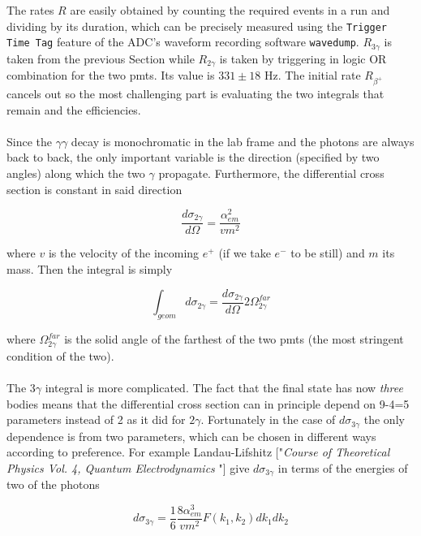 \documentclass[10pt,a4paper,twocolumn]{article}
\begin{document}
\\
\\
The rates $R$ are easily obtained by counting the required events in a run and dividing by its duration, which can be precisely measured using the \texttt{Trigger Time Tag} feature of the ADC's waveform recording software \texttt{wavedump}. $R_{3\gamma}$ is taken from the previous Section while $R_{2\gamma}$ is taken by triggering in logic OR combination for the two pmts. Its value is $331 \pm 18$ Hz. The initial rate $R_{\beta^+}$ cancels out so the most challenging part is evaluating the two integrals that remain and the efficiencies.
\\
\\
Since the $\gamma \gamma$ decay is monochromatic in the lab frame and the photons are always back to back, the only important variable is the direction (specified by two angles) along which the two $\gamma$ propagate. Furthermore, the differential cross section is constant in said direction

\begin{equation}
    \frac{d\sigma_{2\gamma}}{d\Omega}=\frac{\alpha_{em}^2}{vm^2}
\end{equation}

\noindent where $v$ is the velocity of the incoming $e^+$ (if we take $e^-$ to be still) and $m$ its mass. Then the integral is simply

\begin{equation}
\label{\sigma2gamma}
     \int_{geom}{d\sigma_{2\gamma}}=\frac{d\sigma_{2\gamma}}{d\Omega}2\Omega^{far}_{2\gamma}
\end{equation}

\noindent where $\Omega^{far}_{2\gamma}$ is the solid angle of the farthest of the two pmts (the most stringent condition of the two).
\\
\\
The $3\gamma$ integral is more complicated. The fact that the final state has now \textit{three} bodies means that the differential cross section can in principle depend on 9-4=5 parameters instead of 2 as it did for $2\gamma$. Fortunately in the case of $d\sigma_{3\gamma}$ the only dependence is from two parameters, which can be chosen in different ways according to preference. For example Landau-Lifshitz ["\textit{Course of Theoretical Physics Vol. 4, Quantum Electrodynamics }"] give $d\sigma_{3\gamma}$ in terms of the energies of two of the photons


\begin{equation}
    d\sigma_{3\gamma}=\frac{1}{6}\frac{8\alpha_{em}^3}{vm^2} F(k_1,k_2)dk_1 dk_2
\end{equation}
\end{document}
